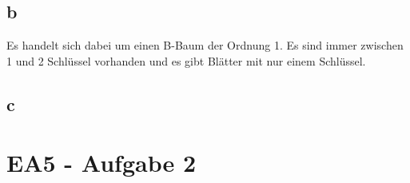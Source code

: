 \documentclass[12pt]{article}
\begin{document}
\begin{figure}[h]
		\centering
	\subfigure[overflow]{\scalebox{.35}{}}
\end{figure}

\begin{figure}[h]
		\centering
	\subfigure[fertig]{\scalebox{.35}{}}
\end{figure}


\newpage

\subsection*{b}
Es handelt sich dabei um einen B-Baum der Ordnung 1. Es sind immer zwischen 1 und 2 Schlüssel vorhanden und es gibt Blätter mit nur einem Schlüssel.
\subsection*{c}

\newpage
\section*{EA5 - Aufgabe 2}
\begin{figure}[h]
	\centering
	\subfigure[0]{\scalebox{.5}{}}
	\hspace{1cm}
		\centering
	\subfigure[6]{\scalebox{.5}{}}
		\hspace{1cm}
		\centering
	\subfigure[3]{\scalebox{.5}{}}
		\hspace{1cm}
		\centering
	\subfigure[9]{\scalebox{.5}{}}
\end{figure}

\begin{figure}[h]
	\centering
	\subfigure[7]{\scalebox{.5}{}}
	\hspace{1cm}
		\centering
	\subfigure[6]{\scalebox{.5}{}}
		\hspace{1cm}
		\centering
	\subfigure[Kosten: 6]{\scalebox{.5}{}}
\end{figure}
\end{document}
